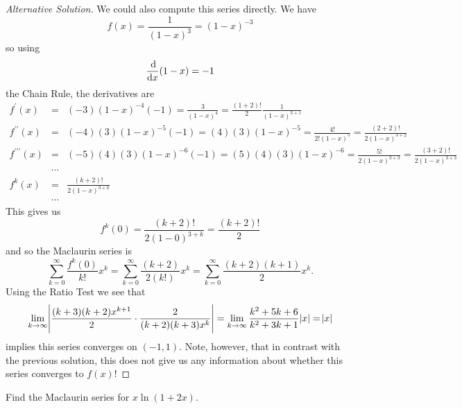 \documentclass[12pt]{amsart}
\begin{document}
\begin{proof}[Alternative Solution]
  We could also compute this series directly.
  We have
  \[f(x) = \frac{1}{(1 - x)^{3}} = (1 - x)^{-3}\]
  so using
  \[\frac{\dif}{\dif x}(1 - x) = -1\]
  the Chain Rule, the derivatives are
  \begin{eqnarray*}
    f^\prime(x) &=& (-3)(1 - x)^{-4}(-1)
    = \frac{3}{(1 - x)^{4}}
    = \frac{(1 + 2)!}{2}\frac{1}{(1-x)^{3 + 1}}\\
    f^{\prime\prime}(x) &=& (-4)(3)(1 - x)^{-5}(-1)
    = (4)(3)(1 - x)^{-5}
    = \frac{4!}{2!(1 - x)^{5}}
    = \frac{(2 + 2)!}{2(1 - x)^{3 + 2}} \\
    f^{\prime\prime\prime}(x) &=& (-5)(4)(3)(1-x)^{-6}(-1)
    = (5)(4)(3)(1 - x)^{-6}
    = \frac{5!}{2(1 - x)^{3+3}}
    = \frac{(3 + 2)!}{2(1 - x)^{3 + 3}}\\
    &\cdots&\\
    f^{k}(x) &=& \frac{(k + 2)!}{2(1 - x)^{3 + k}}\\
    &\cdots&
  \end{eqnarray*}
  This gives us
  \[f^k(0) = \frac{(k+2)!}{2(1 - 0)^{3 + k}} = \frac{(k+2)!}{2}\]
  and so the Maclaurin series is
  \[\sum_{k = 0}^\infty \frac{f^k(0)}{k!} x^k = \sum_{k = 0}^\infty \frac{(k+2)}{2(k!)} x^k = \sum_{k = 0}^\infty \frac{(k+2)(k+1)}{2} x^k.\]
  Using the Ratio Test we see that
  \[\lim_{k \to \infty} \abs{\frac{(k+3)(k+2)x^{k+1}}{2} \cdot \frac{2}{(k+2)(k+3)x^k}} = \lim_{k \to \infty} \frac{k^2 + 5k + 6}{k^2 + 3k + 1} \abs{x} = \abs{x}\]
  implies this series converges on \((-1,1)\).
  Note, however, that in contrast with the previous solution, this does not give us any information about whether this series converges to \(f(x)\)!
\end{proof}

\begin{thm}[25 Points]
  Find the Maclaurin series for \(x\ln(1 + 2x)\).
\end{thm}
\end{document}
